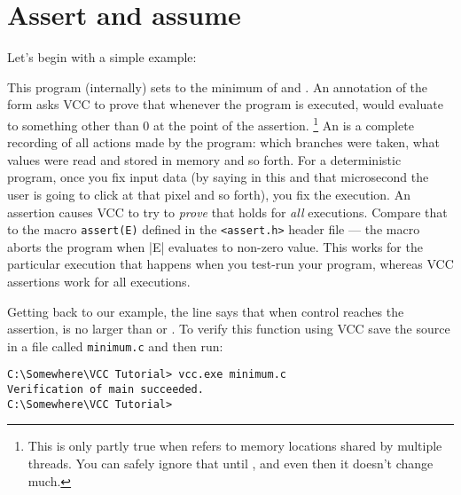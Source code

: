 \section{Assert and assume}
\label{sect:assert-assume}


Let's begin with a simple example:

This program (internally) sets  to the minimum of  and
. 
An annotation of the form  asks VCC to prove that whenever
the program is executed,  would evaluate to something other than 0 at the point of the assertion.%
\footnote{This is only partly true when  refers to memory locations shared by multiple
threads.
You can safely ignore that until , and even then it doesn't change much.
}
An  is a complete recording of all actions made by the program:
which branches were taken, what values were read and stored in memory
and so forth.
For a deterministic program, once you fix input data (\eg by saying in this and that
microsecond the user is going to click at that pixel and so forth),
you fix the execution.
An assertion causes VCC to try to \emph{prove} that  holds for \emph{all}
executions.
Compare that to the macro \lstinline|assert(E)| defined in the \lstinline|<assert.h>|
header file --- the macro aborts the program when \vcc|E| evaluates to non-zero value.
This works for the particular execution that happens when you test-run your program,
whereas VCC assertions work for all executions.

Getting back to our example,
the line  says
that when control reaches the assertion,  is no larger than  or
. 
To verify this function using VCC save the source in a file called \lstinline|minimum.c|
and then run:

\begin{lstlisting}
C:\Somewhere\VCC Tutorial> vcc.exe minimum.c
Verification of main succeeded.
C:\Somewhere\VCC Tutorial>
\end{lstlisting}

